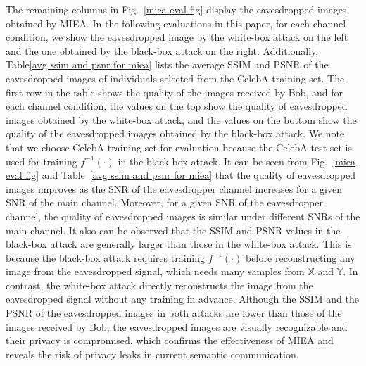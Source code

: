 \documentclass[conference]{IEEEtran}
\begin{document}
The remaining columns in Fig.~\ref{miea eval fig} display the eavesdropped images obtained by MIEA. In the following evaluations in this paper, for each channel condition, we show the eavesdropped image by the white-box attack on the left and the one obtained by the black-box attack on the right. Additionally, Table\ref{avg ssim and psnr for miea} lists the average SSIM and PSNR of the eavesdropped images of individuals selected from the CelebA training set. The first row in the table shows the quality of the images received by Bob, and for each channel condition, the values on the top show the quality of eavesdropped images obtained by the white-box attack, and the values on the bottom show the quality of the eavesdropped images obtained by the black-box attack. We note that we choose CelebA training set for evaluation because the CelebA test set is used for training $f^{-1}(\cdot)$ in the black-box attack. It can be seen from Fig.~\ref{miea eval fig} and Table~\ref{avg ssim and psnr for miea} that the quality of eavesdropped images improves as the SNR of the eavesdropper channel increases for a given SNR of the main channel. Moreover, for a given SNR of the eavesdropper channel, the quality of eavesdropped images is similar under different SNRs of the main channel. It also can be observed that the SSIM and PSNR values in the black-box attack are generally larger than those in the white-box attack. This is because the black-box attack requires training $f^{-1}(\cdot)$ before reconstructing any image from the eavesdropped signal, which needs many samples from $\mathbb{X}$ and $\mathbb{Y}$. In contrast, the white-box attack directly reconstructs the image from the eavesdropped signal without any training in advance. Although the SSIM and the PSNR of the eavesdropped images in both attacks are lower than those of the images received by Bob, the eavesdropped images are visually recognizable and their privacy is compromised, which confirms the effectiveness of MIEA and reveals the risk of privacy leaks in current semantic communication.
\end{document}
